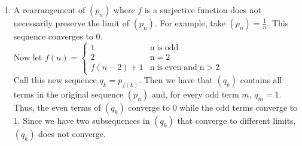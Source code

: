 \documentclass[12pt]{article}
\newenvironment{problem}[2][Problem]{\begin{trivlist}
\item[\hskip \labelsep {\bfseries #1}\hskip \labelsep {\bfseries #2.}]}{\end{trivlist}}
\begin{document}
\begin{enumerate}[label=(\alph*)]
	\item A rearrangement of $(p_n)$ where $f$ is a surjective function does not necessarily preserve the limit of $(p_n)$. For example, take $(p_n) = \frac{1}{n}$. This sequence converges to 0.\\
	
	Now let $f(n) = \begin{cases} 
      1 & \mathrm{n \; is \; odd}\\
      2 & \mathrm{n = 2}\\
      f(n-2)+1 & \mathrm{n \; is \; even \; and \; n > 2}
   \end{cases}$\\
   
   Call this new sequence $q_k = p_{f(k)}$. Then we have that $(q_k)$ contains all terms in the original sequence $(p_n)$ and, for every odd term $m$, $q_m = 1$. Thus, the even terms of $(q_k)$ converge to 0 while the odd terms converge to 1. Since we have two subsequences in $(q_k)$ that converge to different limits, $(q_k)$ does not converge.
\end{enumerate}

\begin{problem}{44 on p. 128}
\end{problem}



\begin{problem}{76 on p. 131}
\end{problem}

\begin{problem}{1 on p. 147}
\end{problem}
\end{document}
